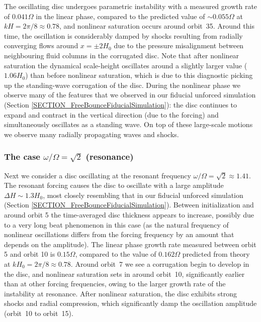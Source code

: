 \documentclass[fleqn,usenatbib]{mnras}
\begin{document}
The oscillating disc undergoes parametric instability with a measured growth rate of $0.041 \Omega$ in the linear phase, compared to the predicted value of $\sim 0.055 \Omega$ at $kH = 2\pi/8 \approx 0.78$, and nonlinear saturation occurs around orbit~35. Around this time, the oscillation is considerably damped by shocks resulting from radially converging flows around $x = \pm 2H_0$ due to the pressure misalignment between neighbouring fluid columns in the corrugated disc. Note that after nonlinear saturation the dynamical scale-height oscillates around a slightly larger value ($1.06H_0$) than before nonlinear saturation, which is due to this diagnostic picking up the standing-wave corrugation of the disc. During the nonlinear phase we observe many of the features that we observed in our fiducial unforced simulation (Section \ref{SECTION_FreeBounceFiducialSimulation}): the disc continues to expand and contract in the vertical direction (due to the forcing) and simultaneously oscillates as a standing wave. On top of these large-scale motions we observe many radially propagating waves and shocks.

\subsubsection{The case $\omega/\Omega = \sqrt{2}$ (resonance)}
\label{SECTION_ForcedBounceSimulation_Omega1pt41_a0pt1}
Next we consider a disc oscillating at the resonant frequency $\omega / \Omega = \sqrt{2} \approx 1.41$. The resonant forcing causes the disc to oscillate with a large amplitude $\Delta H \sim 1.3H_0$, most closely resembling that in our fiducial unforced simulation (Section \ref{SECTION_FreeBounceFiducialSimulation}). Between initialization and around orbit 5 the time-averaged disc thickness appears to increase, possibly due to a very long beat phenomenon in this case (as the natural frequency of nonlinear oscillations differs from the forcing frequency by an amount that depends on the amplitude). The linear phase growth rate measured between orbit 5 and orbit 10 is $0.15 \Omega$, compared to the value of $0.162 \Omega$ predicted from theory at $k H_0 = 2\pi/8 \approx 0.78$. Around orbit~7 we see a corrugation begin to develop in the disc, and nonlinear saturation sets in around orbit~10, significantly earlier than at other forcing frequencies, owing to the larger growth rate of the instability at resonance. After nonlinear saturation, the disc exhibits strong shocks and radial compression, which significantly damp the oscillation amplitude (orbit~10 to orbit~15). 
\end{document}
